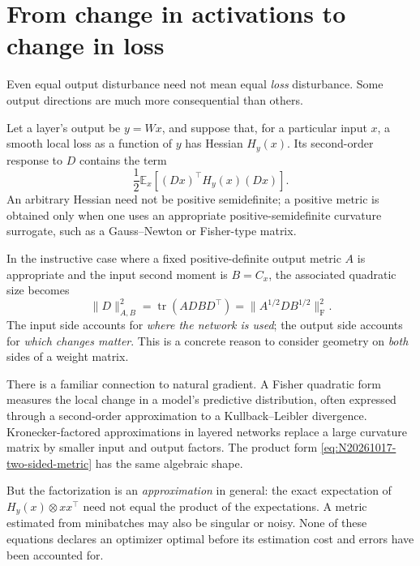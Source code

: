 \section{From change in activations to change in loss}

Even equal output disturbance need not mean equal \emph{loss} disturbance.  Some output directions are much more consequential than others.

Let a layer's output be \(y=Wx\), and suppose that, for a particular input \(x\), a smooth local loss as a function of \(y\) has Hessian \(H_y(x)\).  Its second-order response to \(D\) contains the term
\begin{equation}
 \frac12\mathbb E_x\left[
 (Dx)^\top H_y(x)(Dx)\right].
 \label{eq:N20261017-functional-curvature}
\end{equation}
An arbitrary Hessian need not be positive semidefinite; a positive metric is obtained only when one uses an appropriate positive-semidefinite curvature surrogate, such as a Gauss--Newton or Fisher-type matrix.

In the instructive case where a fixed positive-definite output metric \(A\) is appropriate and the input second moment is \(B=C_x\), the associated quadratic size becomes
\begin{equation}
 \|D\|_{A,B}^2
 =\operatorname{tr}(ADBD^\top)
 =\|A^{1/2}DB^{1/2}\|_{\mathrm F}^2.
 \label{eq:N20261017-two-sided-metric}
\end{equation}
The input side accounts for \emph{where the network is used}; the output side accounts for \emph{which changes matter}.  This is a concrete reason to consider geometry on \emph{both} sides of a weight matrix.

There is a familiar connection to natural gradient.  A Fisher quadratic form measures the local change in a model's predictive distribution, often expressed through a second-order approximation to a Kullback--Leibler divergence.  Kronecker-factored approximations in layered networks replace a large curvature matrix by smaller input and output factors.  The product form \eqref{eq:N20261017-two-sided-metric} has the same algebraic shape.

But the factorization is an \emph{approximation} in general: the exact expectation of \(H_y(x)\otimes xx^\top\) need not equal the product of the expectations.  A metric estimated from minibatches may also be singular or noisy.  None of these equations declares an optimizer optimal before its estimation cost and errors have been accounted for.

